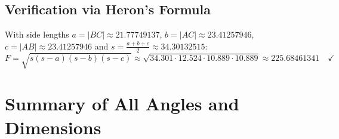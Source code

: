 \subsection*{Verification via Heron's Formula}

With side lengths
$a = |BC| \approx 21.77749137$,
$b = |AC| \approx 23.41257946$,
$c = |AB| \approx 23.41257946$ and
$s = \tfrac{a+b+c}{2} \approx 34.30132515$:
\[
  F = \sqrt{s(s-a)(s-b)(s-c)}
  \approx \sqrt{34.301\cdot 12.524\cdot 10.889\cdot 10.889}
  \approx 225.68461341 \quad\checkmark
\]

\section{Summary of All Angles and Dimensions}

